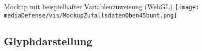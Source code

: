 \documentclass[10pt]{beamer}
\begin{document}
%
%
\begin{frame}{Mockup mit beispielhafter Variablenzuweisung (WebGL)}
	\texttt{[image: mediaDefense/vis/MockupZufallsdatenOben45bunt.png]}
\end{frame}

\subsection{Glyphdarstellung} %
\end{document}
